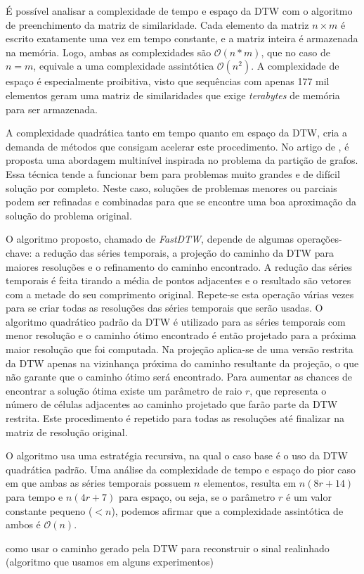 É possível analisar a complexidade de tempo e espaço da DTW com o algoritmo de preenchimento da matriz de similaridade. Cada elemento da matriz $n \times m$ é escrito exatamente uma vez em tempo constante, e a matriz inteira é armazenada na memória. Logo, ambas as complexidades são $\mathcal{O}(n * m)$, que no caso de $n = m$, equivale a uma complexidade assintótica $\mathcal{O}(n^2)$. A complexidade de espaço é especialmente proibitiva, visto que sequências com apenas 177 mil elementos geram uma matriz de similaridades que exige \textit{terabytes} de memória para ser armazenada.

A complexidade quadrática tanto em tempo quanto em espaço da DTW, cria a demanda de métodos que consigam acelerar este procedimento. No artigo de \citet{salvador2007toward}, é proposta uma abordagem multinível inspirada no problema da partição de grafos. Essa técnica tende a funcionar bem para problemas muito grandes e de difícil solução por completo. Neste caso, soluções de problemas menores ou parciais podem ser refinadas e combinadas para que se encontre uma boa aproximação da solução do problema original.

O algoritmo proposto, chamado de \textit{FastDTW}, depende de algumas operações-chave: a redução das séries temporais, a projeção do caminho da DTW para maiores resoluções e o refinamento do caminho encontrado. A redução das séries temporais é feita tirando a média de pontos adjacentes e o resultado são vetores com a metade do seu comprimento original. Repete-se esta operação várias vezes para se criar todas as resoluções das séries temporais que serão usadas. O algoritmo quadrático padrão da DTW é utilizado para as séries temporais com menor resolução e o caminho ótimo encontrado é então projetado para a próxima maior resolução que foi computada. Na projeção aplica-se de uma versão restrita da DTW apenas na vizinhança próxima do caminho resultante da projeção, o que não garante que o caminho ótimo será encontrado. Para aumentar as chances de encontrar a solução ótima existe um parâmetro de raio $r$, que representa o número de células adjacentes ao caminho projetado que farão parte da DTW restrita. Este procedimento é repetido para todas as resoluções até finalizar na matriz de resolução original.

O algoritmo usa uma estratégia recursiva, na qual o caso base é o uso da DTW quadrática padrão. Uma análise da complexidade de tempo e espaço do pior caso em que ambas as séries temporais possuem $n$ elementos, resulta em $n(8r + 14)$ para tempo e $n(4r + 7)$ para espaço, ou seja, se o parâmetro $r$ é um valor constante pequeno ($<n$), podemos afirmar que a complexidade assintótica de ambos é $\mathcal{O}(n)$.


como usar o caminho gerado pela DTW para reconstruir o sinal realinhado (algoritmo que usamos em alguns experimentos)